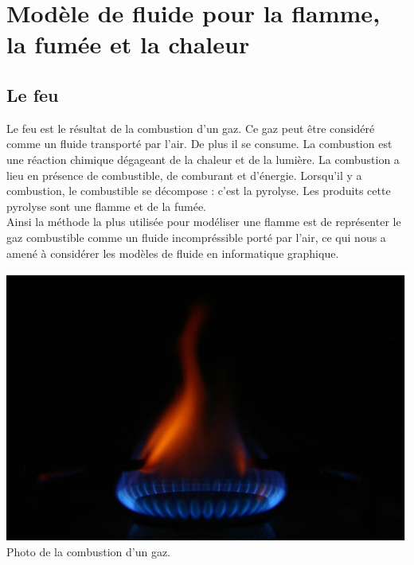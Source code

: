 \documentclass[a4paper,10pt]{article}
\begin{document}
\newpage



\section{Modèle de fluide pour la flamme, la fumée et la chaleur}

\subsection{Le feu}
Le feu est le résultat de la combustion d'un gaz. Ce gaz peut être considéré comme
un fluide transporté par l'air. De plus il se consume. La combustion est une réaction
chimique dégageant de la chaleur et de la lumière. La combustion a lieu en présence
de combustible, de comburant et d'énergie. Lorsqu'il y a combustion, le combustible
se décompose : c'est la pyrolyse. Les produits cette pyrolyse sont une flamme et de la fumée.\\

Ainsi la méthode la plus utilisée pour modéliser une flamme est de représenter le gaz
combustible comme un fluide incompréssible porté par l'air, ce qui nous a amené à
considérer les modèles de fluide en informatique graphique.

    \begin{center}
	\includegraphics[scale=0.3]{Gaz.ps}\\
	Photo de la combustion d'un gaz.
    \end{center}
    
\end{document}
